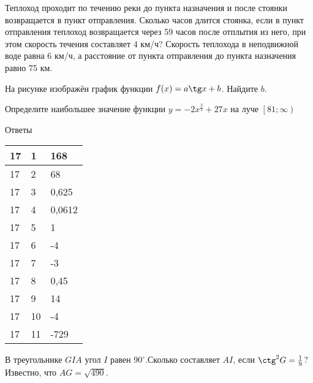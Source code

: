 \documentclass[twocolumn]{article}
\begin{document}
\begin{taskBN}{9}
Теплоход проходит по течению реки до пункта назначения и после стоянки возвращается в пункт отправления. Сколько часов длится стоянка, если в пункт отправления теплоход возвращается через 59 часов после отплытия из него, при этом скорость течения составляет 4 км/ч? Скорость теплохода в неподвижной воде равна 6 км/ч, а расстояние от пункта отправления до пункта назначения равно 75 км. 
\end{taskBN}

\begin{taskBN}{10}
На рисунке изображён график функции $f(x)=a\tg x+b$. Найдите $b$.\vspace{2.5cm}
\end{taskBN}

\begin{taskBN}{11}
Определите наибольшее значение функции $y = -2x^{\frac{3}{2}}+27x$ на луче $\left[81;\infty \right)$
\end{taskBN}

\newpage
 Ответы

\begin{table}[h]\begin{tabular}{|l|l|l|}
\hline
17 & 1 & 168
\\
\hline
17 & 2 & 68
\\
\hline
17 & 3 & 0,625
\\
\hline
17 & 4 & 0,0612
\\
\hline
17 & 5 & 1
\\
\hline
17 & 6 & -4
\\
\hline
17 & 7 & -3
\\
\hline
17 & 8 & 0,45
\\
\hline
17 & 9 & 14
\\
\hline
17 & 10 & -4
\\
\hline
17 & 11 & -729
\\
\hline
\end{tabular}\end{table}



\newpage




\cleardoublepage
\def\examvart{Вариант 17.2}
\normalsize

\startpartone
\large




\begin{taskBN}{1}
В треугольнике $GIA$ угол $I$ равен $90^\circ$.Сколько составляет  $AI$, если $\ctg^2{G}=\frac{1}{9}$? Известно, что  $AG=\sqrt{490}$. 
\end{taskBN}
\end{document}
